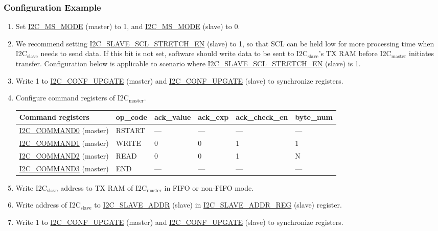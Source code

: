 \documentclass[main\_\_EN.tex]{subfiles}
\begin{document}
\subsubsection{Configuration Example}
\begin{enumerate}
\item Set \hyperref[fielddesc:I2CMSMODE]{I2C\_MS\_MODE} (master) to 1, and \hyperref[fielddesc:I2CMSMODE]{I2C\_MS\_MODE} (slave) to 0.
\item We recommend setting \hyperref[fielddesc:I2CSLAVESCLSTRETCHEN]{I2C\_SLAVE\_SCL\_STRETCH\_EN} (slave) to 1, so that SCL can be held low for more processing time when I2C$_\text{slave}$ needs to send data. If this bit is not set, software should write data to be sent to I2C$_\text{slave}$'s TX RAM before I2C$_\text{master}$ initiates transfer. Configuration below is applicable to scenario where \hyperref[fielddesc:I2CSLAVESCLSTRETCHEN]{I2C\_SLAVE\_SCL\_STRETCH\_EN} (slave) is 1. 
\item Write 1 to \hyperref[fielddesc:I2CCONFUPGATE]{I2C\_CONF\_UPGATE} (master) and \hyperref[fielddesc:I2CCONFUPGATE]{I2C\_CONF\_UPGATE} (slave) to synchronize registers.
\item Configure command registers of I2C$_\text{master}$.
\begin{longtable}{ | p{4cm} | p{2cm} | p{2cm} | p{2cm} |p{2cm} | p{2cm} |}
\hline\rowcolor{lightgray}
Command registers & op\_code & ack\_value&ack\_exp&ack\_check\_en&byte\_num  \\ \hline
\hyperref[fielddesc:I2CCOMMAND0]{I2C\_COMMAND0} (master)& RSTART& ---&---&---&---  \\ \hline
\hyperref[fielddesc:I2CCOMMAND1]{I2C\_COMMAND1} (master)& WRITE& 0&0&1&1  \\ \hline
\hyperref[fielddesc:I2CCOMMAND2]{I2C\_COMMAND2} (master)& READ& 0&0&1&N  \\ \hline
\hyperref[fielddesc:I2CCOMMAND3]{I2C\_COMMAND3} (master)& END& ---&---&---&---  \\ \hline
\end{longtable}
\item Write I2C$_\text{slave}$ address to TX RAM of I2C$_\text{master}$ in FIFO or non-FIFO mode.
\item Write address of I2C$_\text{slave}$ to \hyperref[fielddesc:I2CSLAVEADDR]{I2C\_SLAVE\_ADDR} (slave) in \hyperref[regdesc:I2CSLAVEADDRREG]{I2C\_SLAVE\_ADDR\_REG} (slave) register.
\item Write 1 to \hyperref[fielddesc:I2CCONFUPGATE]{I2C\_CONF\_UPGATE} (master) and \hyperref[fielddesc:I2CCONFUPGATE]{I2C\_CONF\_UPGATE} (slave) to synchronize registers.

\end{enumerate}
\end{document}
